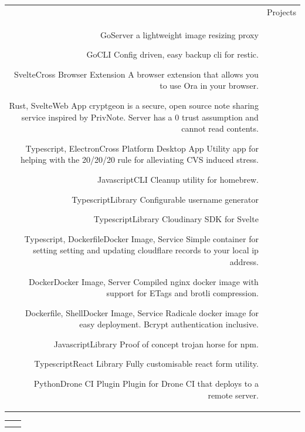 \documentclass[letterpaper,12pt]{article}
\renewcommand{\baselinestretch}{1.2}
\newcommand{\headingfont}{\Large\color{accent}\BluuNext}
\newenvironment{SectionTable}[1]{
	\renewcommand*{\arraystretch}{1.7}
	\setlength{\tabcolsep}{10pt}
	\begin{longtable}{Rp{5.2in}} & #1 \\}
{\end{longtable}\vspace{-.3cm}}
\begin{document}
\begin{SectionTable}{\headingfont Projects}

  {Go}{Server}
  {
    a lightweight image resizing proxy
  }

  {Go}{CLI}
  {
    Config driven, easy backup cli for restic.
  }

  {Svelte}{Cross Browser Extension}
  {
    A browser extension that allows you to use Ora in your browser.
  }

  {Rust, Svelte}{Web App}{
    cryptgeon is a secure, open source note sharing service inspired by PrivNote. Server has a 0 trust assumption and cannot read contents.
  }

  {Typescript, Electron}{Cross Platform Desktop App}{
    Utility app for helping with the 20/20/20 rule for alleviating CVS induced stress.
  }

  {Javascript}{CLI}{
    Cleanup utility for homebrew.
  }

  {Typescript}{Library}{
    Configurable username generator
  }

  {Typescript}{Library}{
    Cloudinary SDK for Svelte
  }

  {Typescript, Dockerfile}{Docker Image, Service}{
    Simple container for setting setting and updating cloudflare records to your local ip address.
  }

  {Docker}{Docker Image, Server}{
    Compiled nginx docker image with support for ETags and brotli compression.
  }

  {Dockerfile, Shell}{Docker Image, Service}{
    Radicale docker image for easy deployment. Bcrypt authentication inclusive.
  }

  {Javascript}{Library}{
    Proof of concept trojan horse for npm.
  }

  {Typescript}{React Library}{
    Fully customisable react form utility.
  }

  {Python}{Drone CI Plugin}{
    Plugin for Drone CI that deploys to a remote server.
  }
\end{SectionTable}


\newpage

\renewcommand{\baselinestretch}{0}
\fontsize{8pt}{8pt}
\selectfont

\begin{SectionTable}{} &
  \printendnotes
\end{SectionTable}
\end{document}
